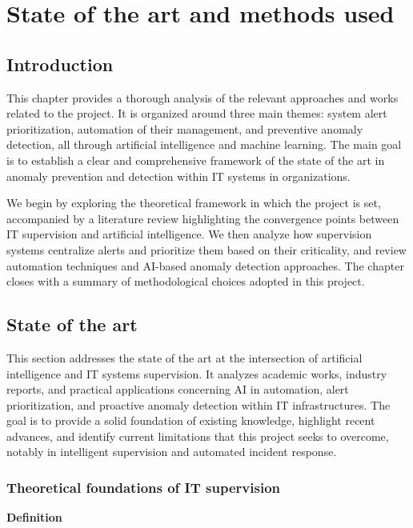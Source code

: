 \documentclass[12pt,a4paper]{article}
\begin{document}

\chapter*{State of the art and methods used}

\section*{Introduction}
This chapter provides a thorough analysis of the relevant approaches and works related to the project. It is organized around three main themes: system alert prioritization, automation of their management, and preventive anomaly detection, all through artificial intelligence and machine learning. The main goal is to establish a clear and comprehensive framework of the state of the art in anomaly prevention and detection within IT systems in organizations.

We begin by exploring the theoretical framework in which the project is set, accompanied by a literature review highlighting the convergence points between IT supervision and artificial intelligence. We then analyze how supervision systems centralize alerts and prioritize them based on their criticality, and review automation techniques and AI-based anomaly detection approaches. The chapter closes with a summary of methodological choices adopted in this project.

\clearpage

\section{State of the art}
This section addresses the state of the art at the intersection of artificial intelligence and IT systems supervision. It analyzes academic works, industry reports, and practical applications concerning AI in automation, alert prioritization, and proactive anomaly detection within IT infrastructures. The goal is to provide a solid foundation of existing knowledge, highlight recent advances, and identify current limitations that this project seeks to overcome, notably in intelligent supervision and automated incident response.

\subsection{Theoretical foundations of IT supervision}
\textbf{Definition}
\end{document}
